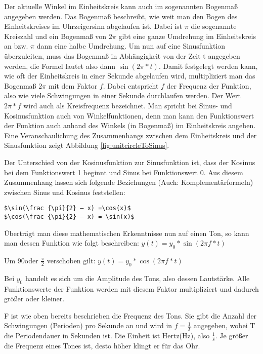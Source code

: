 Der aktuelle Winkel im Einheitskreis kann auch im sogenannten Bogenmaß angegeben werden. Das Bogenmaß beschreibt, wie weit man den Bogen des Einheitskreises im Uhrzeigersinn abgelaufen ist. Dabei ist $\pi$ die sogenannte Kreiszahl und ein Bogenmaß von $2\pi$ gibt eine ganze Umdrehung im Einheitskreis an bzw. $\pi$ dann eine halbe Umdrehung. Um nun auf eine Sinusfunktion überzuleiten, muss das Bogenmaß in Abhängigkeit von der Zeit t angegeben werden, die Formel lautet also dann $\sin(2\pi*t)$. Damit festgelegt werden kann, wie oft der Einheitskreis in einer Sekunde abgelaufen wird, multipliziert man das Bogenmaß $2\pi$ mit dem Faktor $f$. Dabei entspricht $f$ der Frequenz der Funktion, also wie viele Schwingungen in einer Sekunde durchlaufen werden. Der Wert $2\pi * f$ wird auch als Kreisfrequenz bezeichnet.
Man spricht bei Sinus- und Kosinusfunktion auch von Winkelfunktionen, denn man kann den Funktionswert der Funktion auch anhand des Winkels (in Bogenmaß) im Einheitskreis angeben. 
Eine Veranschaulichung des Zusammenhangs zwischen dem Einheitskreis und der Sinusfunktion zeigt Abbildung \ref{fig:unitcircleToSinus}.

Der Unterschied von der Kosinusfunktion zur Sinusfunktion ist, dass der Kosinus bei dem Funktionswert 1 beginnt und Sinus bei Funktionswert 0. Aus diesem Zusammenhang lassen sich folgende Beziehungen (Auch: Komplementärformeln) zwischen Sinus und Kosinus feststellen:\\

\begin{lstlisting}[mathescape]
$\sin(\frac {\pi}{2} – x) =\cos(x)$
$\cos(\frac {\pi}{2} – x) = \sin(x)$ 
\end{lstlisting}\cite[s. 218]{matheBuch}

Überträgt man diese mathematischen Erkenntnisse nun auf einen Ton, so kann man dessen Funktion wie folgt beschreiben: 		$y(t) = y_0 * \sin(2 \pi f * t)$

Um 90\degree oder $\frac{\pi}{2}$ verschoben gilt: 		$y(t) = y_0*\cos(2 \pi f*t)$

Bei $y_0$ handelt es sich um die Amplitude des Tons, also dessen Lautstärke. Alle Funktionswerte der Funktion werden mit diesem Faktor multipliziert und dadurch größer oder kleiner.

F ist wie oben bereits beschrieben die Frequenz des Tons. Sie gibt die Anzahl der Schwingungen (Perioden) pro Sekunde an und wird in $f=\frac{1}{T}$ angegeben, wobei T die Periodendauer in Sekunden ist. Die Einheit ist Hertz(Hz), also $\frac{1}{s}$.
Je größer die Frequenz eines Tones ist, desto höher klingt er für das Ohr.

